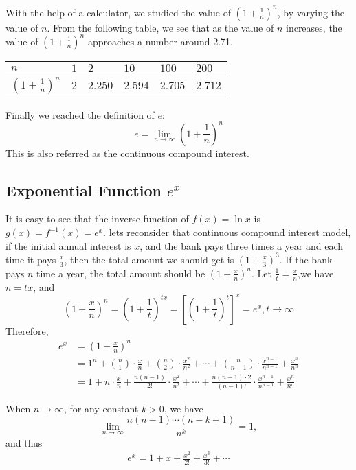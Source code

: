 \documentclass[11pt, oneside]{article}   	%
\begin{document}
With the help of a calculator, we studied the value of $\left(1+\frac{1}{n}\right)^n$, by varying the value of $n$. From the following table, we see that as the value of $n$ increases, the value of $\left(1+\frac{1}{n}\right)^n$ approaches a number around 2.71. 
\begin{center}
\begin{tabular}{|>{\centering}p{1.5cm}|>{\centering}p{1cm}|>{\centering}p{1cm}|>{\centering}p{1cm}|>{\centering}p{1cm}|>{\centering\arraybackslash}p{1cm}|}
\hline
$n$ & $1$ & $2$ & $10$ & $100$ & $200$\\
\hline
$\left(1+\frac{1}{n}\right)^n$ & $2$ & $2.250$ & $2.594$ & $2.705$ & $2.712$\\
\hline
\end{tabular}
\end{center}

Finally we reached the definition of $e$:
\[e=\lim_{n\rightarrow \infty}\left(1+\frac{1}{n}\right)^n\]
This is also referred as the continuous compound interest. 
\subsection{Exponential Function $e^x$} 
It is easy to see that the inverse function of $f(x)=\ln x$ is $g(x)=f^{-1}(x)=e^x$.
lets reconsider that continuous compound interest model, if the initial annual interest is $x$, and the bank pays three times a year and each time it pays $\frac{x}{3}$, then the total amount we should get is $\left(1+\frac{x}{3}\right)^3$. If the bank pays $n$ time a year, the total amount should be $(1+\frac{x}{n})^n$. Let $\frac{1}{t}=\frac{x}{n}$,we have $n=tx$, and \[\left(1+\frac{x}{n}\right)^n = \left(1+\frac{1}{t}\right)^{tx} = \left[\left(1+\frac{1}{t}\right)^t\right]^x=e^x, t\rightarrow \infty \]
Therefore, 
\begin{align*}
e^x&=\left(1+\frac{x}{n}\right)^n\\
&= 1^n+\binom{n}{1}\cdot\frac{x}{n} + \binom{n}{2}\cdot\frac{x^2}{n^2} + \cdots + \binom{n}{n-1}\cdot\frac{x^{n-1}}{n^{n-1}} + \frac{x^n}{n^n} \\
&=1+n\cdot\frac{x}{n}+\frac{n(n-1)}{2!}\cdot\frac{x^2}{n^2}+ \cdots + \frac{n(n-1)\cdot2}{(n-1)!}\cdot\frac{x^{n-1}}{n^{n-1}} + \frac{x^n}{n^n}
\end{align*}

When $n\rightarrow \infty$, for any constant $k>0$, we have
\[\lim_{n\rightarrow \infty} \frac{n(n-1)\cdots(n-k+1)}{n^k}=1,\] and thus 
\begin{align*}
e^x=1+x + \frac{x^2}{2!} + \frac{x^3}{3!} + \cdots
\end{align*} 
\end{document}
